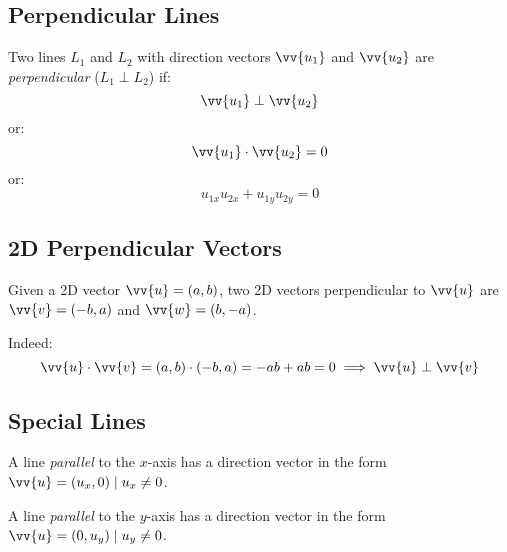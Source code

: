 \subsection{Perpendicular Lines}
	Two lines $L_1$ and $L_2$ with direction vectors $\vv{u_1}$ and $\vv{u_2}$ are \emph{perpendicular} ($L_1 \perp L_2$) if:
	\[\vv{u_1} \perp \vv{u_2}\]
	or:
	\[\vv{u_1} \cdot \vv{u_2} = 0\]
	or:
	\[u_{1x}u_{2x} + u_{1y}u_{2y} = 0\]
\subsection{2D Perpendicular Vectors}
	Given a 2D vector $\vv{u} = (a, b)$, two 2D vectors perpendicular to $\vv{u}$ are $\vv{v} = (-b, a)$ and $\vv{w} = (b, -a)$.

	Indeed:
	\[\vv{u} \cdot \vv{v} = (a, b) \cdot (-b, a) = -ab + ab = 0 \implies \vv{u} \perp \vv{v}\]
\subsection{Special Lines}
	A line \emph{parallel} to the $x$-axis has a direction vector in the form $\vv{u} = (u_x, 0) \such u_x \neq 0$.

	A line \emph{parallel} to the $y$-axis has a direction vector in the form $\vv{u} = (0, u_y) \such u_y \neq 0$.
